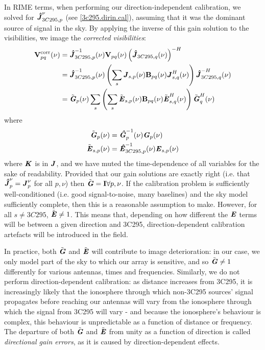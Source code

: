 \pg
In RIME terms, when performing our direction-independent calibration, we solved for $\textbf{\emph{\^{J}}}_{3C295,p}^{\nu}$ (see \cref{3c295.dirin.cal}), assuming that it was the dominant source of signal in the sky. By applying the inverse of this gain solution to the visibilities, we image the \textit{corrected visibilities}:
\begin{align}
\textbf{V}_{pq}^\mathrm{corr} (\nu) &= \textbf{\emph{\^{J}}}_{3C295,p}^{-1}(\nu) \textbf{V}_{pq}(\nu) \left(\textbf{\emph{\^{J}}}_{3C295,q}(\nu)\right)^{-H}\\
                        &=  \textbf{\emph{\^{J}}}_{3C295,p}^{-1}(\nu) \left(\sum_s \textbf{\emph{J}}_{s,p}(\nu)\textbf{B}_{pq}(\nu) \textbf{\emph{J}}^H_{s,q}(\nu)\right) \textbf{\emph{\^{J}}}^{-H}_{3C295,q}(\nu)\\
                        &= \tilde{\textbf{\emph{G}}}_{p}(\nu) \sum_s \left( \sum_s \tilde{\textbf{\emph{E}}}_{s,p}(\nu)\textbf{B}_{pq}(\nu) \tilde{\textbf{\emph{E}}}_{s,q}^H(\nu)\right) \tilde{\textbf{\emph{G}}}^H_{q}(\nu)
\end{align}
where
\begin{align}
\tilde{\textbf{\emph{G}}}_{p}(\nu) &= \textbf{\emph{\^{G}}}_{p}^{-1}(\nu)\textbf{\emph{G}}_{p}(\nu)\\
\tilde{\textbf{\emph{E}}}_{s,p}(\nu) &= \textbf{\emph{\^{E}}}_{3C295,p}^{-1}(\nu)\textbf{\emph{E}}_{s,p}(\nu)
\end{align}                        
where $\textbf{\emph{K}}$ is in $\textbf{\emph{J}}$, and we have muted the time-dependence of all variables for the sake of readability. Provided that our gain solutions are exactly right (i.e. that $\textbf{\emph{\^{J}}}_p^{\nu}=\textbf{\emph{J}}_p^{\nu}$ for all $p,\nu$) then $\tilde{\textbf{\emph{G}}}=\bm{\mathrm{I}} \forall p,\nu$. If the calibration problem is sufficiently well-conditioned (i.e. good signal-to-noise, many baselines) and the sky model sufficiently complete, then this is a reasonable assumption to make. However, for all $s\ne 3C295$, $\tilde{\textbf{\emph{E}}}\ne 1$. This means that, depending on how different the $\textbf{\emph{E}}$ terms will be between a given direction and 3C295, direction-dependent calibration artefacts will be introduced in the field. 

\pg
In practice, both $\tilde{\textbf{\emph{G}}}$ and $\tilde{\textbf{\emph{E}}}$ will contribute to image deterioration: in our case, we only model part of the sky to which our array is sensitive, and so $\tilde{\textbf{\emph{G}}}\ne 1$ differently for various antennas, times and frequencies. Similarly, we do not perform direction-dependent calibration: as distance increases from 3C295, it is increasingly likely that the ionosphere through which non-3C295 sources' signal propagates before reaching our antennas will vary from the ionosphere through which the signal from 3C295 will vary - and because the ionosphere's behaviour is complex, this behaviour is unpredictable as a function of distance or frequency. The departure of both $\tilde{\textbf{\emph{G}}}$ and $\tilde{\textbf{\emph{E}}}$ from unity as a function of direction is called \textit{directional gain errors}, as it is caused by direction-dependent effects. 

